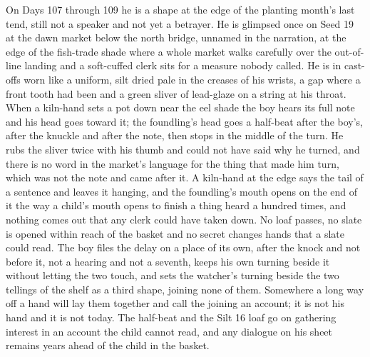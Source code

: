 \documentclass{design/chronicle}
\begin{document}
{On Days 107 through 109 he is a shape at the edge of the planting month’s last tend, still not a speaker and not yet a betrayer. He is glimpsed once on Seed 19 at the dawn market below the north bridge, unnamed in the narration, at the edge of the fish-trade shade where a whole market walks carefully over the out-of-line landing and a soft-cuffed clerk sits for a measure nobody called. He is in cast-offs worn like a uniform, silt dried pale in the creases of his wrists, a gap where a front tooth had been and a green sliver of lead-glaze on a string at his throat. When a kiln-hand sets a pot down near the eel shade the boy hears its full note and his head goes toward it; the foundling’s head goes a half-beat after the boy’s, after the knuckle and after the note, then stops in the middle of the turn. He rubs the sliver twice with his thumb and could not have said why he turned, and there is no word in the market’s language for the thing that made him turn, which was not the note and came after it. A kiln-hand at the edge says the tail of a sentence and leaves it hanging, and the foundling’s mouth opens on the end of it the way a child’s mouth opens to finish a thing heard a hundred times, and nothing comes out that any clerk could have taken down. No loaf passes, no slate is opened within reach of the basket and no secret changes hands that a slate could read. The boy files the delay on a place of its own, after the knock and not before it, not a hearing and not a seventh, keeps his own turning beside it without letting the two touch, and sets the watcher’s turning beside the two tellings of the shelf as a third shape, joining none of them. Somewhere a long way off a hand will lay them together and call the joining an account; it is not his hand and it is not today. The half-beat and the Silt 16 loaf go on gathering interest in an account the child cannot read, and any dialogue on his sheet remains years ahead of the child in the basket.

}
\end{document}
